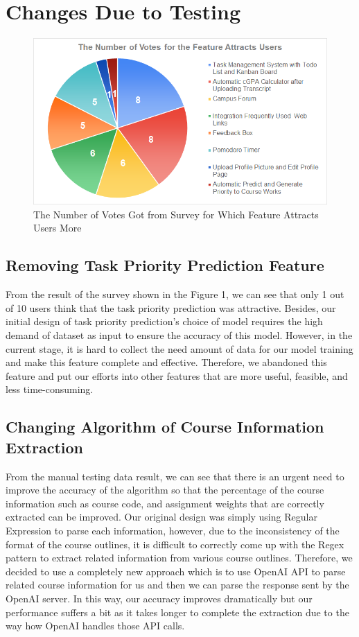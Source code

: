 \documentclass[12pt, titlepage]{article}
\begin{document}
\section{Changes Due to Testing}
\begin{figure}[H]
    \centering
    \includegraphics[width=1\linewidth]{Frequency of use of functions.png}
    \caption{The Number of Votes Got from Survey for Which Feature Attracts Users More}
    \label{fig:enter-label}
\end{figure}




\subsection{Removing Task Priority Prediction Feature}\label{TPPD}
From the result of the survey shown in the Figure 1, we can see that only 1 out of 10 users think that the task priority prediction was attractive. Besides, our initial design of task priority prediction's choice of model requires the high demand of dataset as input to ensure the accuracy of this model. However, in the current stage, it is hard to collect the need amount of data for our model training and make this feature complete and effective. Therefore, we abandoned this feature and put our efforts into other features that are more useful, feasible, and less time-consuming.


\subsection{Changing Algorithm of Course Information Extraction}\label{CIEN}
From the manual testing data result, we can see that there is an urgent need to improve the accuracy of the algorithm so that the percentage of the course information such as course code, and assignment weights that are correctly extracted can be improved. Our original design was simply using Regular Expression to parse each information, however, due to the inconsistency of the format of the course outlines, it is difficult to correctly come up with the Regex pattern to extract related information from various course outlines. Therefore, we decided to use a completely new approach which is to use OpenAI API to parse related course information for us and then we can parse the response sent by the OpenAI server. In this way, our accuracy improves dramatically but our performance suffers a bit as it takes longer to complete the extraction due to the way how OpenAI handles those API calls.
\end{document}

